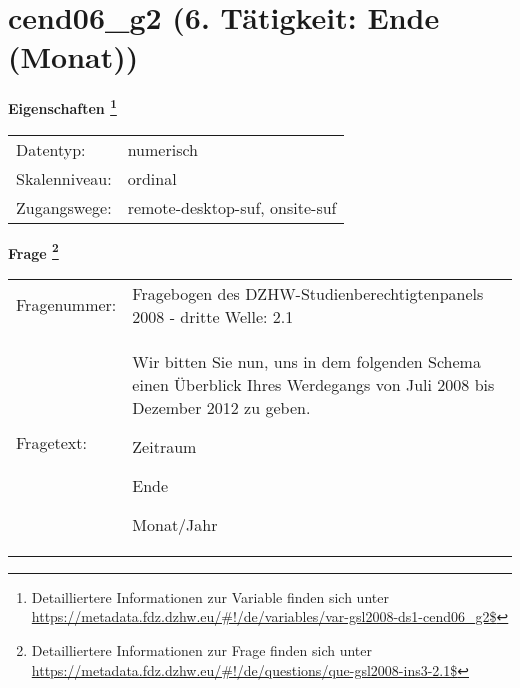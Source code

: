 
    \setcounter{footnote}{0}

    \vspace*{-1.8cm}
	\section{cend06\_g2 (6. Tätigkeit: Ende (Monat))}
	\label{section:cend06_g2}



    \vspace*{0.5cm}
    \noindent\textbf{Eigenschaften
	\footnote{Detailliertere Informationen zur Variable finden sich unter
		\url{https://metadata.fdz.dzhw.eu/\#!/de/variables/var-gsl2008-ds1-cend06_g2$}}}\\
	\begin{tabularx}{\hsize}{@{}lX}
	Datentyp: & numerisch \\
	Skalenniveau: & ordinal \\
	Zugangswege: &
	  remote-desktop-suf, 
	  onsite-suf
 \\
    \end{tabularx}



				\vspace*{0.5cm}
                \noindent\textbf{Frage
	                \footnote{Detailliertere Informationen zur Frage finden sich unter
		              \url{https://metadata.fdz.dzhw.eu/\#!/de/questions/que-gsl2008-ins3-2.1$}}}\\
				\begin{tabularx}{\hsize}{@{}lX}
					Fragenummer: &
					  Fragebogen des DZHW-Studienberechtigtenpanels 2008 - dritte Welle:
					  2.1
 \\
					Fragetext: & Wir bitten Sie nun, uns in dem folgenden Schema einen Überblick Ihres Werdegangs von Juli 2008 bis Dezember 2012 zu geben.\par  Zeitraum\par  Ende\par  Monat/Jahr \\
				\end{tabularx}





